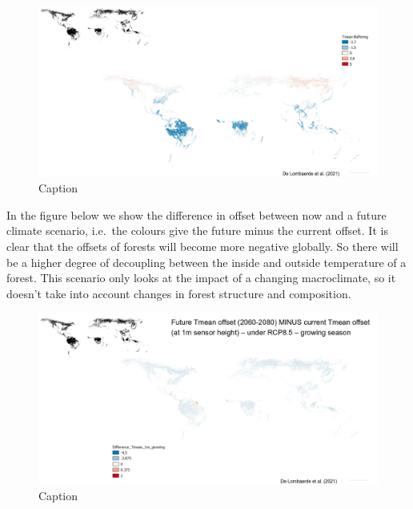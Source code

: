 \documentclass[12pt,oneside]{book}
\begin{document}
\begin{figure}

{\centering \includegraphics[width=1\linewidth]{figures/Figure1042} 

}

\caption{Caption}\label{fig:Micro42}
\end{figure}

In the figure below we show the difference in offset between now and a
future climate scenario, i.e.~the colours give the future minus the
current offset. It is clear that the offsets of forests will become more
negative globally. So there will be a higher degree of decoupling
between the inside and outside temperature of a forest. This scenario
only looks at the impact of a changing macroclimate, so it doesn't take
into account changes in forest structure and composition.

\begin{figure}

{\centering \includegraphics[width=1\linewidth]{figures/Figure1043} 

}

\caption{Caption}\label{fig:Micro43}
\end{figure}


\end{document}
